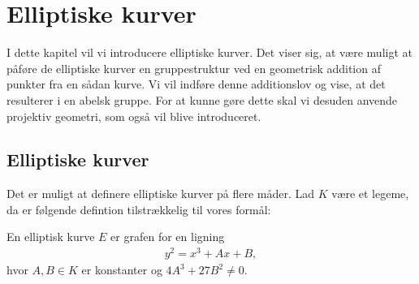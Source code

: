 \chapter{Elliptiske kurver}
I dette kapitel vil vi introducere elliptiske kurver.
Det viser sig, at være muligt at påføre de elliptiske kurver en gruppestruktur ved en geometrisk addition af punkter fra en sådan kurve. Vi vil indføre denne additionslov og vise, at det resulterer i en abelsk gruppe. For at kunne gøre dette skal vi desuden anvende projektiv geometri, som også vil blive introduceret.

\section{Elliptiske kurver}
Det er muligt at definere elliptiske kurver på flere måder. Lad $K$ være et legeme, da er følgende defintion tilstrækkelig til vores formål:

\begin{definition}
En elliptisk kurve $E$ er grafen for en ligning
\begin{align}
	\label{elliptic_curve}
	y^2 = x^3 + Ax + B,
\end{align}
hvor $A, B \in K$ er konstanter og $4A^3 + 27B^2 \neq 0$. 
\end{definition}

